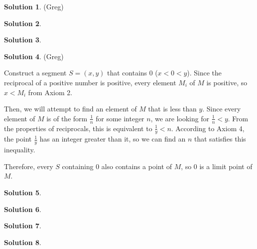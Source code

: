 \documentclass{article}
\theoremstyle{definition}
\newtheorem{solution}{Solution}
\begin{document}
\begin{solution} %
(Greg)

\end{solution}

\begin{solution} %
\end{solution}

\begin{solution} %
\end{solution}

\begin{solution} %
(Greg)

Construct a segment $S = (x, y)$ that contains $0$ ($x < 0 < y$).
Since the reciprocal of a positive number is positive, every element $M_i$ of $M$ is positive, so $x < M_i$ from Axiom 2.

Then, we will attempt to find an element of $M$ that is less than $y$.
Since every element of $M$ is of the form $\frac{1}{n}$ for some integer $n$, we are looking for $\frac{1}{n} < y$.
From the properties of reciprocals, this is equivalent to $\frac{1}{y} < n$.
According to Axiom 4, the point $\frac{1}{y}$ has an integer greater than it, so we can find an $n$ that satisfies this inequality.

Therefore, every $S$ containing $0$ also contains a point of $M$, so $0$ is a limit point of $M$.
\end{solution}

\begin{solution} %
\end{solution}

\begin{solution} %
\end{solution}

\begin{solution} %
\end{solution}

\begin{solution}
\end{solution}
\end{document}
